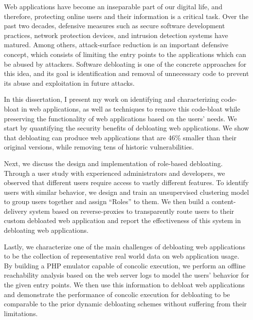 Web applications have become an inseparable part of our digital life, and therefore, protecting online users and their information is a critical task. 
Over the past two decades, defensive measures such as secure software development practices, network protection devices, and intrusion detection systems have matured. 
Among others, attack-surface reduction is an important defensive concept, which consists of limiting the entry points to the applications which can be abused by attackers. 
Software debloating is one of the concrete approaches for this idea, and its goal is identification and removal of unnecessary code to prevent its abuse and exploitation in future attacks. 

In this dissertation, I present my work on identifying and characterizing code-bloat in web applications, as well as techniques to remove this code-bloat while preserving the functionality of web applications based on the users' needs.
We start by quantifying the security benefits of debloating web applications. We show that debloating can produce web applications that are 46\% smaller than their original versions, while removing tens of historic vulnerabilities. 

Next, we discuss the design and implementation of role-based debloating.
Through a user study with experienced administrators and developers, we observed that different users require access to vastly different features.
To identify users with similar behavior, we design and train an unsupervised clustering model to group users together and assign ``Roles'' to them. 
We then build a content-delivery system based on reverse-proxies to transparently route users to their custom debloated web application and report the effectiveness of this system in debloating web applications. 

Lastly, we characterize one of the main challenges of debloating web applications to be the collection of representative real world data on web application usage. By building a PHP emulator capable of concolic execution, we perform an offline reachability analysis based on the web server logs to model the users' behavior for the given entry points. We then use this information to debloat web applications and demonstrate the performance of concolic execution for debloating to be comparable to the prior dynamic debloating schemes without suffering from their limitations.